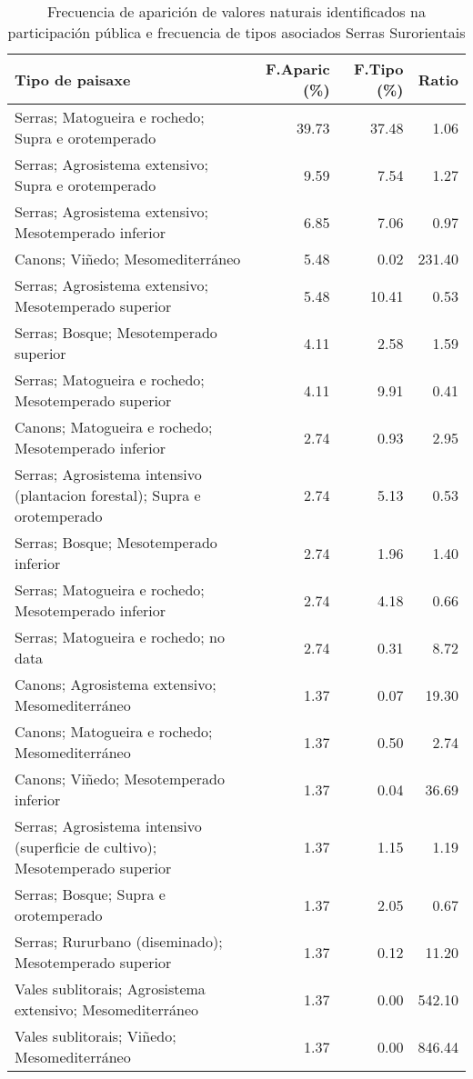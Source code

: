 \begin{table}[p]
\centering
\caption{Frecuencia de aparición de valores naturais identificados na participación pública e frecuencia de tipos asociados Serras Surorientais} 
\label{vsixotnat9}
\begin{tabular}{lrrr}
  \hline
Tipo de paisaxe & F.Aparic (\%) & F.Tipo (\%) & Ratio \\ 
  \hline
Serras; Matogueira e rochedo; Supra e orotemperado & 39.73 & 37.48 & 1.06 \\ 
  Serras; Agrosistema extensivo; Supra e orotemperado & 9.59 & 7.54 & 1.27 \\ 
  Serras; Agrosistema extensivo; Mesotemperado inferior & 6.85 & 7.06 & 0.97 \\ 
  Canons; Viñedo; Mesomediterráneo & 5.48 & 0.02 & 231.40 \\ 
  Serras; Agrosistema extensivo; Mesotemperado superior & 5.48 & 10.41 & 0.53 \\ 
  Serras; Bosque; Mesotemperado superior & 4.11 & 2.58 & 1.59 \\ 
  Serras; Matogueira e rochedo; Mesotemperado superior & 4.11 & 9.91 & 0.41 \\ 
  Canons; Matogueira e rochedo; Mesotemperado inferior & 2.74 & 0.93 & 2.95 \\ 
  Serras; Agrosistema intensivo (plantacion forestal); Supra e orotemperado & 2.74 & 5.13 & 0.53 \\ 
  Serras; Bosque; Mesotemperado inferior & 2.74 & 1.96 & 1.40 \\ 
  Serras; Matogueira e rochedo; Mesotemperado inferior & 2.74 & 4.18 & 0.66 \\ 
  Serras; Matogueira e rochedo; no data & 2.74 & 0.31 & 8.72 \\ 
  Canons; Agrosistema extensivo; Mesomediterráneo & 1.37 & 0.07 & 19.30 \\ 
  Canons; Matogueira e rochedo; Mesomediterráneo & 1.37 & 0.50 & 2.74 \\ 
  Canons; Viñedo; Mesotemperado inferior & 1.37 & 0.04 & 36.69 \\ 
  Serras; Agrosistema intensivo (superficie de cultivo); Mesotemperado superior & 1.37 & 1.15 & 1.19 \\ 
  Serras; Bosque; Supra e orotemperado & 1.37 & 2.05 & 0.67 \\ 
  Serras; Rururbano (diseminado); Mesotemperado superior & 1.37 & 0.12 & 11.20 \\ 
  Vales sublitorais; Agrosistema extensivo; Mesomediterráneo & 1.37 & 0.00 & 542.10 \\ 
  Vales sublitorais; Viñedo; Mesomediterráneo & 1.37 & 0.00 & 846.44 \\ 
   \hline
\end{tabular}
\end{table}
